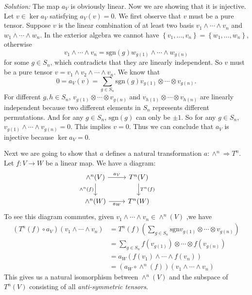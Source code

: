 \documentclass[a4paper, 12pt]{article}
\newenvironment{solution}
    {\textit{Solution:}}
    {}
\begin{document}
\begin{solution}
The map \(a_V\) is obviously linear. Now we are showing that it is injective. Let \(v\in \ker a_V\) satisfying \(a_V(v)=0\). We first observe that \(v\) must be a pure tensor. Suppose \(v\) is the linear combination of 
at least two basis \(v_1\wedge \cdots\wedge v_n\) and \(w_1\wedge \cdots\wedge w_n\). In the exterior algebra we cannot have \(\left\{ v_1,\ldots,v_n \right\}=\left\{ w_1,\ldots,w_n \right\}\), otherwise 
\[v_1\wedge \cdots\wedge v_n=\text{sgn}(g)w_{g(1)}\wedge \cdots\wedge w_{g(n)}\]
for some \(g\in S_n\), which contradicts that they are linearly independent. So \(v\) must be a pure tensor \(v=v_1\wedge v_2\wedge \cdots\wedge v_n\). We know that 
\[0=a_V(v)=\sum_{g\in S_n}\text{sgn}(g)v_{g(1)}\otimes \cdots\otimes v_{g(n)}.\]
For different \(g,h\in S_n\), \(v_{g(1)}\otimes \cdots\otimes v_{g(n)}\) and \(v_{h(1)}\otimes \cdots\otimes v_{h(n)}\) are linearly independent because two different elements in \(S_n\) represents different permutations. And for any \(g\in S_n\), 
\(\text{sgn}(g)\) can only be \(\pm 1\). So for any \(g\in S_n\), \(v_{g(1)}\wedge \cdots\wedge v_{g(n)}=0\). This implies \(v=0\). Thus we can conclude that \(a_V\) is injective because \(\ker a_V=0\). 
\par 
Next we are going to show that \(a\) defines a natural transformation \(a:\wedge^n\Rightarrow T^n\). Let \(f:V\rightarrow W\) be a linear map. We have a diagram:
\[\begin{tikzcd}
	{\wedge^n(V)} & {T^n(V)} & {} \\
	{\wedge^n(W)} & {T^n(W)}
	\arrow["{a_V}", from=1-1, to=1-2]
	\arrow["{\wedge^n(f)}"', from=1-1, to=2-1]
	\arrow["{T^n(f)}", from=1-2, to=2-2]
	\arrow["{a_W}"', from=2-1, to=2-2]
\end{tikzcd}\]
To see this diagram commutes, given \(v_1\wedge \cdots\wedge v_n\in \wedge^n(V)\) ,we have 
\begin{align*}
	(T^n(f)\circ a_V)(v_1\wedge \cdots\wedge v_n) & =T^n(f)(\sum_{g\in S_n}\text{sgn}v_{g(1)}\otimes \cdots\otimes v_{g(n)})\\ 
	                                              & =\sum_{g\in S_n}f(v_{g(1)})\otimes \cdots\otimes f(v_{g(n)})\\ 
												  & =a_W(f(v_1)\wedge \cdots\wedge f(v_n))\\ 
												  & =(a_W\circ \wedge^n(f))(v_1\wedge \cdots\wedge v_n)
\end{align*}
This gives us a natural isomorphism between \(\wedge^n(V)\) and the subspace of \(T^n(V)\) consisting of all \textit{anti-symmetric tensors}.
\end{solution}
\end{document}
